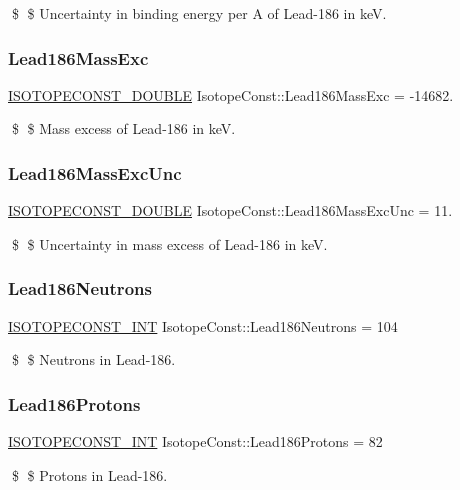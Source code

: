 \$ \$ Uncertainty in binding energy per A of Lead-\/186 in keV. \mbox{\label{group___isotope_const-_lead-_pb186_gaede7c0663bc53b5773b7b25e131b7851}} 
\subsubsection{\texorpdfstring{Lead186\+Mass\+Exc}{Lead186MassExc}}
{\footnotesize\ttfamily \mbox{\hyperlink{group___isotope_const-_macros_ga8f45a7272ce02c0b4c65c44636ed719a}{I\+S\+O\+T\+O\+P\+E\+C\+O\+N\+S\+T\+\_\+\+D\+O\+U\+B\+LE}} Isotope\+Const\+::\+Lead186\+Mass\+Exc = -\/14682.}

\$ \$ Mass excess of Lead-\/186 in keV. \mbox{\label{group___isotope_const-_lead-_pb186_ga61777ecb04a378d404c58cf33a168d91}} 
\subsubsection{\texorpdfstring{Lead186\+Mass\+Exc\+Unc}{Lead186MassExcUnc}}
{\footnotesize\ttfamily \mbox{\hyperlink{group___isotope_const-_macros_ga8f45a7272ce02c0b4c65c44636ed719a}{I\+S\+O\+T\+O\+P\+E\+C\+O\+N\+S\+T\+\_\+\+D\+O\+U\+B\+LE}} Isotope\+Const\+::\+Lead186\+Mass\+Exc\+Unc = 11.}

\$ \$ Uncertainty in mass excess of Lead-\/186 in keV. \mbox{\label{group___isotope_const-_lead-_pb186_ga88e0df78d45342f359bb48ece3d88906}} 
\subsubsection{\texorpdfstring{Lead186\+Neutrons}{Lead186Neutrons}}
{\footnotesize\ttfamily \mbox{\hyperlink{group___isotope_const-_macros_ga5f18360b3e99483a35c32d789e62621c}{I\+S\+O\+T\+O\+P\+E\+C\+O\+N\+S\+T\+\_\+\+I\+NT}} Isotope\+Const\+::\+Lead186\+Neutrons = 104}

\$ \$ Neutrons in Lead-\/186. \mbox{\label{group___isotope_const-_lead-_pb186_gaec2edf7b763a1c3769a98cda65cf0da3}} 
\subsubsection{\texorpdfstring{Lead186\+Protons}{Lead186Protons}}
{\footnotesize\ttfamily \mbox{\hyperlink{group___isotope_const-_macros_ga5f18360b3e99483a35c32d789e62621c}{I\+S\+O\+T\+O\+P\+E\+C\+O\+N\+S\+T\+\_\+\+I\+NT}} Isotope\+Const\+::\+Lead186\+Protons = 82}

\$ \$ Protons in Lead-\/186. 